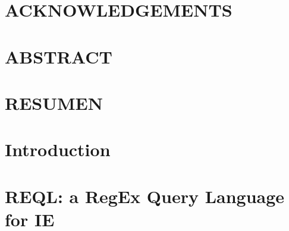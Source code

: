 \documentclass[pdftex]{pucthesis}	%
\begin{document}



 \label{acknowledgements} %
\chapter*{ACKNOWLEDGEMENTS}


\cleardoublepage



\tableofcontents
{} \label{listoffigures}
\listoffigures
{} \label{listoftables}
\listoftables
\cleardoublepage



 \label{abstract}
\chapter*{ABSTRACT}

\cleardoublepage

 \label{resumen}
\chapter*{RESUMEN}

\cleardoublepage

\fancyhf{}
\fancyhead[R]{\fontsize{11pt}{11pt}\selectfont\thepage}

\chapter[INTRODUCTION]{Introduction}


\chapter[REQL: A REGEX QUERY LANGUAGE FOR IE]{REQL: a RegEx Query Language for IE} \label{chpt:regex}

\end{document}
